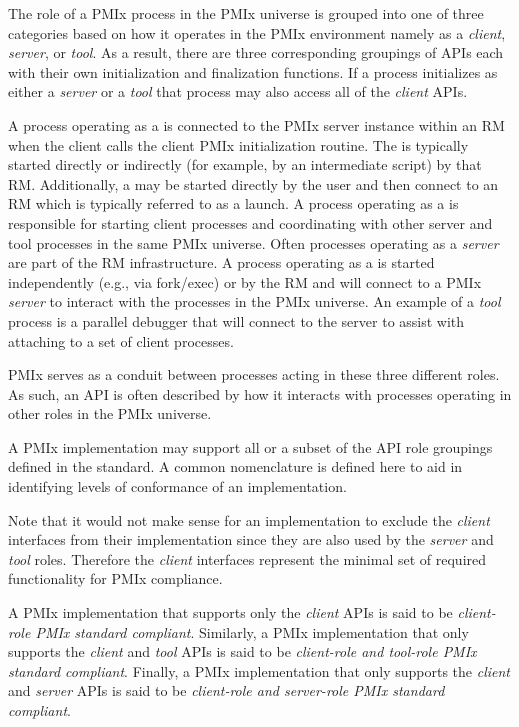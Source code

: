 The role of a \ac{PMIx} process in the \ac{PMIx} universe is grouped into one of three categories based on how it operates in the \ac{PMIx} environment namely as a \emph{client}, \emph{server}, or \emph{tool}.
As a result, there are three corresponding groupings of \acp{API} each with their own initialization and finalization functions.
If a process initializes as either a \emph{server} or a \emph{tool} that process may also access all of the \emph{client} \acp{API}.

A process operating as a  is connected to the \ac{PMIx} server instance within an \ac{RM} when the client calls the client \ac{PMIx} initialization routine.
The  is typically started directly or indirectly (for example, by an intermediate script) by that \ac{RM}.
Additionally, a  may be started directly by the user and then connect to an \ac{RM} which is typically referred to as a  launch.
A process operating as a  is responsible for starting client processes and coordinating with other server and tool processes in the same \ac{PMIx} universe.
Often processes operating as a \emph{server} are part of the \acf{RM} infrastructure.
A process operating as a  is started independently (e.g., via fork/exec) or by the \ac{RM} and will connect to a \ac{PMIx} \emph{server} to interact with the processes in the \ac{PMIx} universe.
An example of a \emph{tool} process is a parallel debugger that will connect to the server to assist with attaching to a set of client processes.

\ac{PMIx} serves as a conduit between processes acting in these three different roles.
As such, an \ac{API} is often described by how it interacts with processes operating in other roles in the \ac{PMIx} universe.

\adviceimplstart
A \ac{PMIx} implementation may support all or a subset of the \ac{API} role groupings defined in the standard.
A common nomenclature is defined here to aid in identifying levels of conformance of an implementation.

Note that it would not make sense for an implementation to exclude the \emph{client} interfaces from their implementation since they are also used by the \emph{server} and \emph{tool} roles.
Therefore the \emph{client} interfaces represent the minimal set of required functionality for \ac{PMIx} compliance.

A \ac{PMIx} implementation that supports only the \emph{client} \acp{API} is said to be \emph{client-role \ac{PMIx} standard compliant}.
Similarly, a \ac{PMIx} implementation that only supports the \emph{client} and \emph{tool} \acp{API} is said to be \emph{client-role and tool-role \ac{PMIx} standard compliant}.
Finally, a \ac{PMIx} implementation that only supports the \emph{client} and \emph{server} \acp{API} is said to be \emph{client-role and server-role \ac{PMIx} standard compliant}.


